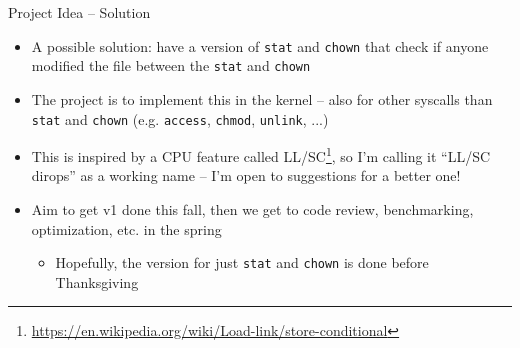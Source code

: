 \documentclass[aspectratio=169]{beamer}
\begin{document}
\begin{frame}{Project Idea -- Solution}
	\begin{itemize}
		\item A possible solution: have a version of \texttt{stat} and \texttt{chown} that check if anyone modified the file between the \texttt{stat} and \texttt{chown}
		\item The project is to implement this in the kernel -- also for other syscalls than \texttt{stat} and \texttt{chown} (e.g. \texttt{access}, \texttt{chmod}, \texttt{unlink}, ...)
		      \pause
		\item This is inspired by a CPU feature called LL/SC\footnote{\url{https://en.wikipedia.org/wiki/Load-link/store-conditional}}, so I'm calling it ``LL/SC dirops'' as a working name -- I'm open to suggestions for a better one!
		\item Aim to get v1 done this fall, then we get to code review, benchmarking, optimization, etc. in the spring
		      \begin{itemize}
			      \item Hopefully, the version for just \texttt{stat} and \texttt{chown} is done before Thanksgiving
		      \end{itemize}
	\end{itemize}
\end{frame}
\end{document}
